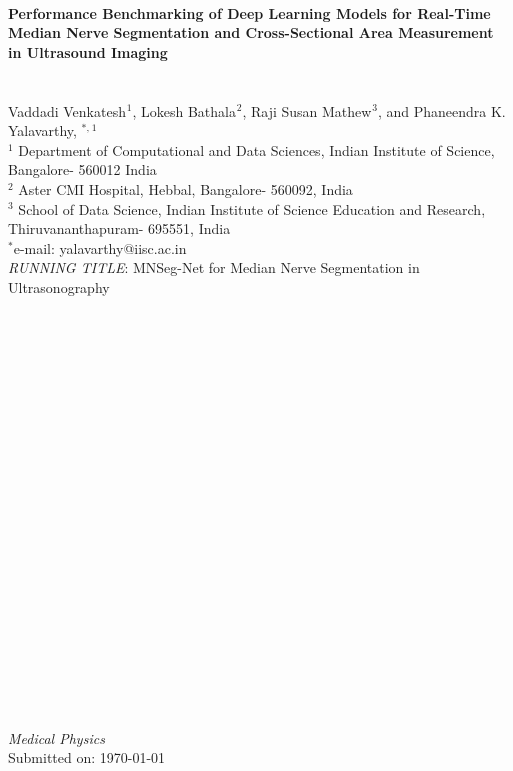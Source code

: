 \linenumbers
\modulolinenumbers[1]



\begin{center}
{\ } 

{\Large\bf Performance Benchmarking of Deep Learning Models for Real-Time Median Nerve Segmentation and Cross-Sectional Area Measurement in Ultrasound Imaging}
{\ }\\ 
{\ }\\
{\ }\\

 \large{Vaddadi Venkatesh$^{}$$^{1}$}, \large{Lokesh Bathala$^{}$$^{2}$}, \large{Raji Susan Mathew$^{}$$^{3}$}, and \large{Phaneendra K. Yalavarthy, $^{\ast,}$$^{1}$}\\
\noindent
{$^{1}$ Department of Computational and Data Sciences, Indian Institute of Science, Bangalore- 560012 India}\\
{$^{2}$ Aster CMI Hospital, Hebbal, Bangalore- 560092, India }\\
{$^{3}$ School of Data Science, Indian Institute of Science Education and Research, Thiruvananthapuram- 695551, India}\\
{$^\ast$e-mail: yalavarthy@iisc.ac.in}\\
{\textit{RUNNING TITLE}: \hspace{0.2cm} MNSeg-Net for Median Nerve Segmentation in Ultrasonography }\\
{\ }
{\ }\\
{\ }\\
{\ }\\
 {\ } \\
 {\ } \\
 {\ }\\
{\ }\\
{\ }\\
 {\ } \\
 {\ } \\
  {\ } \\
 {\ } \\
{\ }\\
 {\ } \\
 {\ } \\
 {\ }\\
{\ }\\
{\ }\\
 {\ } \\
 {\ } \\
  {\ } \\
 {\ } \\
\emph{Medical Physics}\\
Submitted on: \today\\
\end{center}

